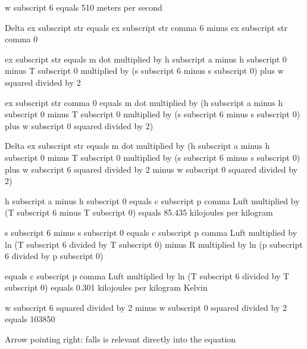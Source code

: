 w subscript 6 equals 510 meters per second  

Delta ex subscript str equals ex subscript str comma 6 minus ex subscript str comma 0  

ex subscript str equals m dot multiplied by h subscript a minus h subscript 0 minus T subscript 0 multiplied by (s subscript 6 minus s subscript 0) plus w squared divided by 2  

ex subscript str comma 0 equals m dot multiplied by (h subscript a minus h subscript 0 minus T subscript 0 multiplied by (s subscript 6 minus s subscript 0) plus w subscript 0 squared divided by 2)  

Delta ex subscript str equals m dot multiplied by (h subscript a minus h subscript 0 minus T subscript 0 multiplied by (s subscript 6 minus s subscript 0) plus w subscript 6 squared divided by 2 minus w subscript 0 squared divided by 2)  

h subscript a minus h subscript 0 equals c subscript p comma Luft multiplied by (T subscript 6 minus T subscript 0) equals 85.435 kilojoules per kilogram  

s subscript 6 minus s subscript 0 equals c subscript p comma Luft multiplied by ln (T subscript 6 divided by T subscript 0) minus R multiplied by ln (p subscript 6 divided by p subscript 0)  

equals c subscript p comma Luft multiplied by ln (T subscript 6 divided by T subscript 0) equals 0.301 kilojoules per kilogram Kelvin  

w subscript 6 squared divided by 2 minus w subscript 0 squared divided by 2 equals 103850  

Arrow pointing right: falls is relevant directly into the equation